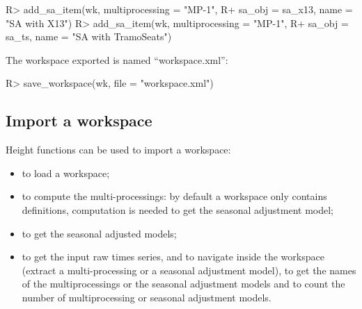 \documentclass[article]{jss}
\providecommand{\tightlist}{%
  \setlength{\itemsep}{0pt}\setlength{\parskip}{0pt}}
\begin{document}
\begin{CodeChunk}

\begin{CodeInput}
R> add_sa_item(wk, multiprocessing = "MP-1",
R+             sa_obj = sa_x13, name =  "SA with X13")
R> add_sa_item(wk, multiprocessing =  "MP-1",
R+             sa_obj = sa_ts, name = "SA with TramoSeats")
\end{CodeInput}
\end{CodeChunk}

The workspace exported is named ``workspace.xml'':

\begin{CodeChunk}

\begin{CodeInput}
R> save_workspace(wk, file =  "workspace.xml")
\end{CodeInput}
\end{CodeChunk}

\hypertarget{import-a-workspace}{%
\subsection{Import a workspace}\label{import-a-workspace}}

Height functions can be used to import a workspace:

\begin{itemize}
\tightlist
\item
   to load a workspace;\\
\item
   to compute the multi-processings: by default a
  workspace only contains definitions, computation is needed to get the
  seasonal adjustment model;\\
\item
   to get the seasonal adjusted models;\\
\item
   to get the input raw times series, 
  and  to navigate inside the workspace (extract a
  multi-processing or a seasonal adjustment model),  to
  get the names of the multiprocessings or the seasonal adjustment
  models and  to count the number of multiprocessing or
  seasonal adjustment models.
\end{itemize}
\end{document}
